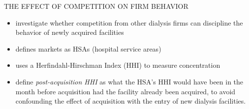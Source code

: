 \begin{frame}{THE EFFECT OF COMPETITION ON FIRM BEHAVIOR}
    \begin{itemize}
        \item investigate whether competition from other dialysis firms can discipline the behavior of newly acquired facilities
        \item defines markets as HSAs (hospital service areas)
        \item uses a Herfindahl-Hirschman Index (HHI) to measure concentration
        \item define \textit{post-acquisition HHI} as what the HSA’s HHI would have been in the month before acquisition had the facility already been acquired, to avoid confounding the effect of acquisition with the entry of new dialysis facilities.
    \end{itemize}
\end{frame}